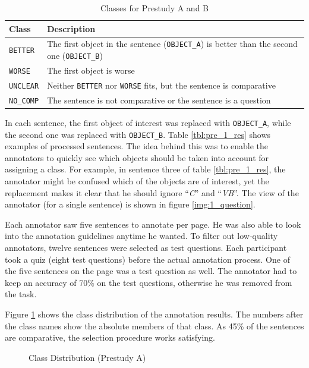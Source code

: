 \begin{table}[h]
\centering
\caption{Classes for Prestudy A and B}
\label{tbl:prestudyclasses-a}
\begin{tabular}{@{}ll@{}}
\toprule
Class & Description \\ \midrule
\texttt{BETTER} & The first object in the sentence (\texttt{OBJECT\_A}) is better than the second one (\texttt{OBJECT\_B})\\
\texttt{WORSE} & The first object is worse \\
\texttt{UNCLEAR} & Neither \texttt{BETTER} nor \texttt{WORSE} fits, but the sentence is comparative\\
\texttt{NO\_COMP} & The sentence is not comparative or the sentence is a question\\
\bottomrule
\end{tabular}
\end{table}

In each sentence, the first object of interest was replaced with \texttt{OBJECT\_A}, while the second one was replaced with \texttt{OBJECT\_B}. Table \ref{tbl:pre_1_res} shows examples of processed sentences. The idea behind this was to enable the annotators to quickly see which objects should be taken into account for assigning a class. For example, in sentence three of table \ref{tbl:pre_1_res}, the annotator might be confused which of the objects are of interest, yet the replacement makes it clear that he should ignore \enquote{\emph{C}} and \enquote{\emph{VB}}. The view of the annotator (for a single sentence) is shown in figure \ref{img:1_question}.

Each annotator saw five sentences to annotate per page. He was also able to look into the annotation guidelines anytime he wanted. To filter out low-quality annotators, twelve sentences were selected as test questions. Each participant took a quiz (eight test questions) before the actual annotation process. One of the five sentences on the page was a test question as well. The annotator had to keep an accuracy of 70\% on the test questions, otherwise he was removed from the task.

Figure \ref{fig:dist_pre_a} shows the class distribution of the annotation results. The numbers after the class names show the absolute members of that class. As 45\% of the sentences are comparative, the selection procedure works satisfying.

\begin{figure}[h]
\centering
\caption{Class Distribution (Prestudy A)}
\label{fig:dist_pre_a}
\end{figure}

